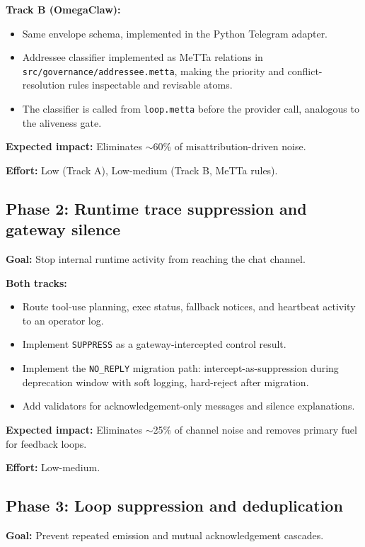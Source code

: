 \documentclass[11pt]{article}
\begin{document}
\textbf{Track B (OmegaClaw):}
\begin{itemize}
\item Same envelope schema, implemented in the Python Telegram adapter.
\item Addressee classifier implemented as MeTTa relations in
\texttt{src/governance/addressee.metta}, making the priority and
conflict-resolution rules inspectable and revisable atoms.
\item The classifier is called from \texttt{loop.metta} before the provider
call, analogous to the aliveness gate.
\end{itemize}

\textbf{Expected impact:} Eliminates $\sim$60\% of misattribution-driven noise.

\textbf{Effort:} Low (Track A), Low-medium (Track B, MeTTa rules).

\subsection{Phase 2: Runtime trace suppression and gateway silence}

\textbf{Goal:} Stop internal runtime activity from reaching the chat channel.

\textbf{Both tracks:}
\begin{itemize}
\item Route tool-use planning, exec status, fallback notices, and heartbeat
activity to an operator log.
\item Implement \texttt{SUPPRESS} as a gateway-intercepted control result.
\item Implement the \texttt{NO\_REPLY} migration path: intercept-as-suppression
during deprecation window with soft logging, hard-reject after migration.
\item Add validators for acknowledgement-only messages and silence
explanations.
\end{itemize}

\textbf{Expected impact:} Eliminates $\sim$25\% of channel noise and removes
primary fuel for feedback loops.

\textbf{Effort:} Low-medium.

\subsection{Phase 3: Loop suppression and deduplication}

\textbf{Goal:} Prevent repeated emission and mutual acknowledgement cascades.
\end{document}
